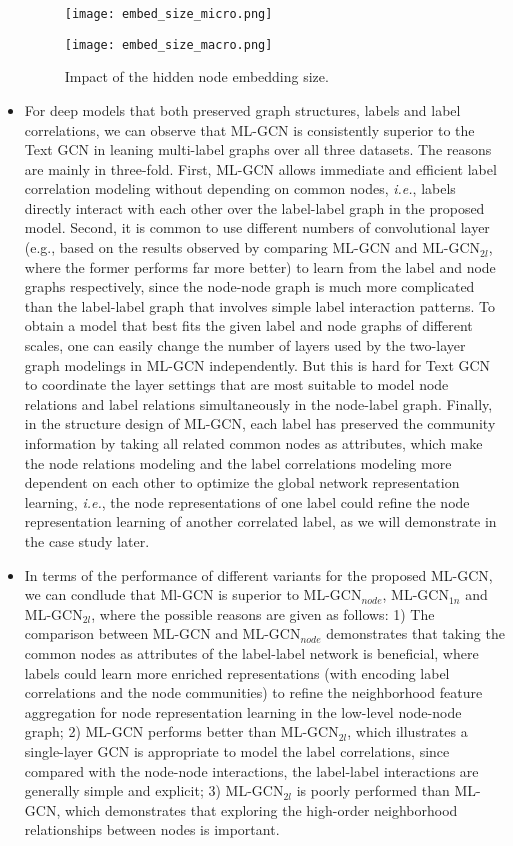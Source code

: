 \documentclass[conference]{IEEEtran}
\begin{document}
\begin{itemize}
\begin{figure}[t]
\centering
\begin{minipage}[b]{0.5\linewidth}
\centering 
\texttt{[image: embed\_size\_micro.png]}
\end{minipage}\begin{minipage}[b]{0.5\linewidth}
\centering 
\texttt{[image: embed\_size\_macro.png]}
\end{minipage}\caption{Impact of the hidden node embedding size.}
\end{figure}    
    \item For deep models that both preserved graph structures, labels and label correlations, we can observe that ML-GCN is consistently superior to the Text GCN in leaning multi-label graphs over all three datasets. The reasons are mainly in three-fold. First, ML-GCN allows immediate and efficient label correlation modeling without depending on common nodes, \textit{i.e.}, labels directly interact with each other over the label-label graph in the proposed model. Second, it is common to use different numbers of convolutional layer (e.g., based on the results observed by comparing ML-GCN and ML-GCN$_{2l}$, where the former performs far more better) to learn from the label and node graphs respectively, since the node-node graph is much more complicated than the label-label graph that involves simple label interaction patterns. To obtain a model that best fits the given label and node graphs of different scales, one can easily change the number of layers used by the two-layer graph modelings in ML-GCN independently. But this is hard  for Text GCN to coordinate the layer settings that are most suitable to model node relations and label relations simultaneously in the node-label graph. Finally, in the structure design of ML-GCN, each label has preserved the community information by taking all related common nodes as attributes, which make the node relations modeling and the label correlations modeling more dependent on each other to optimize the global network representation learning, \textit{i.e.}, the node representations of one label could refine the node representation learning of another correlated label, as we will demonstrate in the case study later.
  \item In terms of the performance of different variants for the proposed ML-GCN, we can condlude that Ml-GCN is superior to ML-GCN$_{node}$, ML-GCN$_{1n}$ and ML-GCN$_{2l}$, where the possible reasons are given as follows: 1) The comparison between ML-GCN and ML-GCN$_{node}$ demonstrates that taking the common nodes as attributes of the label-label network is beneficial, where labels could learn more enriched representations (with encoding label correlations and the node communities) to refine the neighborhood feature aggregation for node representation learning in the low-level node-node graph; 2) ML-GCN performs better than ML-GCN$_{2l}$, which illustrates a single-layer GCN is appropriate to model the label correlations, since compared with the node-node interactions, the label-label interactions are generally simple and explicit; 3) ML-GCN$_{2l}$ is poorly performed than ML-GCN, which demonstrates that exploring the high-order neighborhood relationships between nodes is important.

\end{itemize}
\end{document}

